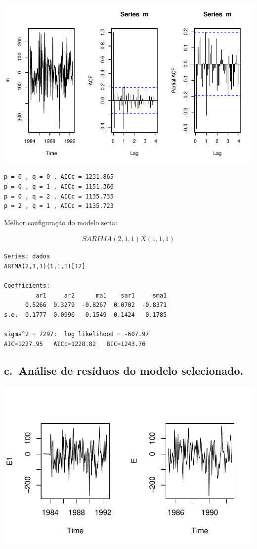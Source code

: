 \documentclass[
  letterpaper,
  DIV=11,
  numbers=noendperiod]{scrartcl}
\begin{document}
\includegraphics{Trabalhao1_ST_grupo5_files/figure-pdf/unnamed-chunk-7-1.pdf}

\begin{verbatim}
p = 0 , q = 0 , AICc = 1231.865 
p = 0 , q = 1 , AICc = 1151.366 
p = 0 , q = 2 , AICc = 1135.735 
p = 2 , q = 1 , AICc = 1135.723 
\end{verbatim}

Melhor configuração do modelo seria:

\begin{align*}
  SARIMA (2, 1, 1) X (1, 1, 1)
\end{align*}

\begin{verbatim}
Series: dados 
ARIMA(2,1,1)(1,1,1)[12] 

Coefficients:
         ar1     ar2      ma1    sar1     sma1
      0.5266  0.3279  -0.8267  0.0702  -0.8371
s.e.  0.1777  0.0996   0.1549  0.1424   0.1785

sigma^2 = 7297:  log likelihood = -607.97
AIC=1227.95   AICc=1228.82   BIC=1243.76
\end{verbatim}

\hypertarget{c.-anuxe1lise-de-resuxedduos-do-modelo-selecionado.}{%
\subsection{c.~Análise de resíduos do modelo
selecionado.}\label{c.-anuxe1lise-de-resuxedduos-do-modelo-selecionado.}}

\includegraphics{Trabalhao1_ST_grupo5_files/figure-pdf/unnamed-chunk-10-1.pdf}
\end{document}
